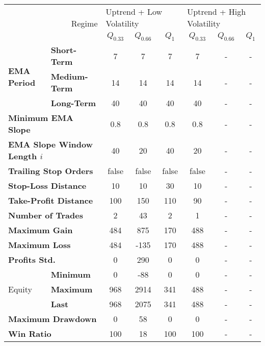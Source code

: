 \centering
\begin{tabular}{ll|cccccc}
    \toprule
    \multicolumn{2}{r|}{\multirow{2}{*}{Regime}} & \multicolumn{3}{l}{Uptrend + Low Volatility}     & \multicolumn{3}{l}{Uptrend + High Volatility}     \\
    \multicolumn{2}{r|}{} & $Q_{0.33}$ & $Q_{0.66}$ & $Q_{1}$ & $Q_{0.33}$ & $Q_{0.66}$ & $Q_{1}$ \\
    \midrule
    \multirow{3}{*}{\textbf{EMA Period}} & \textbf{Short-Term}  & 7   & 7    & 7   & 7   & - & - \\
    & \textbf{Medium-Term} & 14  & 14   & 14  & 14  & - & - \\
    & \textbf{Long-Term}   & 40  & 40   & 40  & 40  & - & - \\
    \multicolumn{2}{l|}{\textbf{Minimum EMA Slope}} & 0.8 & 0.8 & 0.8 & 0.8 & - & - \\
    \multicolumn{2}{l|}{\textbf{EMA Slope Window Length $i$}} & 40 & 20 & 40 & 20 & - & - \\
    \multicolumn{2}{l|}{\textbf{Trailing Stop Orders}} & false & false & false & false & - & - \\
    \multicolumn{2}{l|}{\textbf{Stop-Loss Distance}} & 10 & 10 & 30 & 10 & - & - \\
    \multicolumn{2}{l|}{\textbf{Take-Profit Distance}} & 100 & 150 & 110 & 90 & - & - \\
    \midrule
    \multicolumn{2}{l|}{\textbf{Number of Trades}} & 2 & 43 & 2 & 1 & - & - \\
    \multicolumn{2}{l|}{\textbf{Maximum Gain}} & 484 & 875 & 170 & 488 & - & - \\
    \multicolumn{2}{l|}{\textbf{Maximum Loss}} & 484 & -135 & 170 & 488 & - & - \\
    \multicolumn{2}{l|}{\textbf{Profits Std.}} & 0 & 290 & 0 & 0 & - & - \\
    \multirow{3}{*}{Equity}              & \textbf{Minimum}     & 0   & -88  & 0   & 0   & - & - \\
    & \textbf{Maximum}     & 968 & 2914 & 341 & 488 & - & - \\
    & \textbf{Last}        & 968 & 2075 & 341 & 488 & - & - \\
    \multicolumn{2}{l|}{\textbf{Maximum Drawdown}} & 0 & 58 & 0 & 0 & - & - \\
    \multicolumn{2}{l|}{\textbf{Win Ratio}} & 100 & 18 & 100 & 100 & - & - \\
    \bottomrule
\end{tabular}